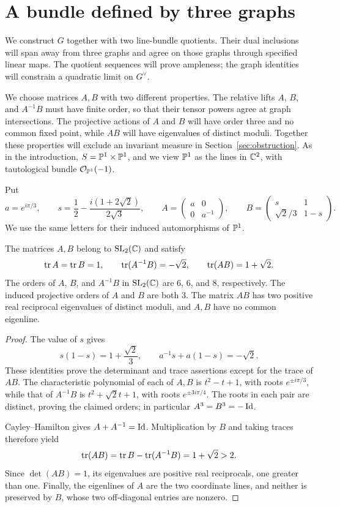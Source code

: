 \section{A bundle defined by three graphs}\label{sec:construction}

We construct $G$ together with two line-bundle quotients. Their dual
inclusions will span away from three graphs and agree on those graphs
through specified linear maps. The quotient sequences will prove
ampleness; the graph identities will constrain a quadratic limit on
$G^\vee$.

We choose matrices $A,B$ with two different properties. The relative
lifts $A$, $B$, and $A^{-1}B$ must have finite order, so that their
tensor powers agree at graph intersections. The projective actions of
$A$ and $B$ will have order three and no common fixed point, while
$AB$ will have eigenvalues of distinct moduli. Together these properties
will exclude an invariant measure in Section~\ref{sec:obstruction}. As in the
introduction, $S=\mathbb P^1\times\mathbb P^1$, and we view $\mathbb P^1$ as the lines
in $\mathbb C^2$, with tautological bundle $\mathcal O_{\mathbb P^1}(-1)$.

Put
\begin{equation}\label{eq:matrices}
 a=e^{i\pi/3},\qquad
 s=\frac12-\frac{i(1+2\sqrt2)}{2\sqrt3},\qquad
 A=\begin{pmatrix}a&0\\0&a^{-1}\end{pmatrix},\qquad
 B=\begin{pmatrix}s&1\\ \sqrt2/3&1-s\end{pmatrix}.
\end{equation}
We use the same letters for their induced automorphisms of $\mathbb P^1$.

\begin{lemma}\label{lem:matrix-data}
The matrices $A,B$ belong to $\operatorname{SL}_2(\mathbb C)$ and satisfy
\[
 \operatorname{tr} A=\operatorname{tr} B=1,\qquad
 \operatorname{tr}(A^{-1}B)=-\sqrt2,\qquad
 \operatorname{tr}(AB)=1+\sqrt2.
\]
The orders of $A$, $B$, and $A^{-1}B$ in $\operatorname{SL}_2(\mathbb C)$ are
$6$, $6$, and $8$, respectively. The induced projective orders of $A$ and $B$
are both $3$. The matrix $AB$ has two positive real reciprocal
eigenvalues of distinct moduli, and $A,B$ have no common eigenline.
\end{lemma}

\begin{proof}
The value of $s$ gives
\[
 s(1-s)=1+\frac{\sqrt2}{3},\qquad
 a^{-1}s+a(1-s)=-\sqrt2.
\]
These identities prove the determinant and trace assertions except
for the trace of $AB$. The characteristic polynomial of each of
$A,B$ is $t^2-t+1$, with roots $e^{\pm i\pi/3}$, while that of
$A^{-1}B$ is $t^2+\sqrt2t+1$, with roots $e^{\pm3i\pi/4}$.
The roots in each pair are distinct, proving the claimed orders;
in particular $A^3=B^3=-\operatorname{Id}$.

Cayley--Hamilton gives $A+A^{-1}=\operatorname{Id}$. Multiplication by $B$ and
taking traces therefore yield
\[
 \operatorname{tr}(AB)=\operatorname{tr} B-\operatorname{tr}(A^{-1}B)=1+\sqrt2>2.
\]
Since $\det(AB)=1$, its eigenvalues are positive real reciprocals,
one greater than one. Finally, the eigenlines of $A$ are the two
coordinate lines, and neither is preserved by $B$, whose two
off-diagonal entries are nonzero.
\end{proof}

